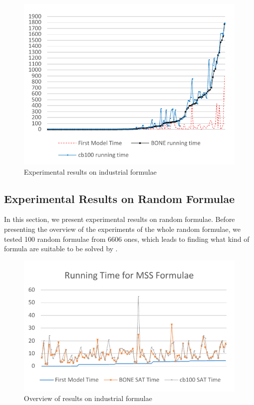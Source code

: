 \begin{figure}
    \centering
    \includegraphics[scale=0.8]{ind2.pdf}
   \caption{Experimental results on industrial formulae}
   \label{fig:ind-time}
\end{figure}

\subsection{Experimental Results on Random Formulae}
In this section, we present experimental results on random formulae. Before presenting the overview of the experiments of the whole random formulae, we tested 100 random formulae from 6606 ones, which leads to finding what kind of formula are suitable to be solved by \tool.

\begin{figure}
    \centering
    \includegraphics[scale=0.7]{mcs.pdf}
   \caption{Overview of results on industrial formulae}
   \label{fig:mcs-time}
\end{figure}


